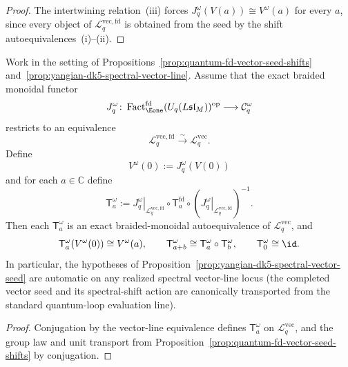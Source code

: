 \begin{proof}
The intertwining relation~\textup{(iii)} forces \(J_q^\omega(V(a))
\cong V^\omega(a)\) for every \(a\), since every object of
\(\mathcal{L}^{\mathrm{vec,fd}}_{q}\) is obtained from the seed by
the shift autoequivalences~\textup{(i)}--\textup{(ii)}.
\end{proof}

\begin{proposition}
\label{prop:yangian-dk5-spectral-seed-shift-construction}
Work in the setting of
Propositions~\ref{prop:quantum-fd-vector-seed-shifts}
and~\ref{prop:yangian-dk5-spectral-vector-line}. Assume that the exact
braided monoidal functor
\[
J_q^\omega\colon
\operatorname{Fact}_{\Eone}^{\mathrm{fd}}(U_q(L\mathfrak{sl}_M))^{\mathrm{op}}
\longrightarrow
\mathcal{C}_q^\omega
\]
restricts to an equivalence
\[
\mathcal{L}^{\mathrm{vec,fd}}_{q}\xrightarrow{\sim}
\mathcal{L}^{\mathrm{vec}}_{q}.
\]
Define
\[
V^\omega(0):=J_q^\omega(V(0))
\]
and for each \(a\in\mathbb{C}\) define
\[
\mathsf{T}^{\omega}_a
:=
\left.J_q^\omega\right|_{\mathcal{L}^{\mathrm{vec,fd}}_{q}}
\circ
\mathsf{T}^{\mathrm{fd}}_a
\circ
\left(\left.J_q^\omega\right|_{\mathcal{L}^{\mathrm{vec,fd}}_{q}}\right)^{-1}.
\]
Then each \(\mathsf{T}^{\omega}_a\) is an exact braided-monoidal
autoequivalence of \(\mathcal{L}^{\mathrm{vec}}_{q}\), and
\[
\mathsf{T}^{\omega}_a(V^\omega(0))\cong V^\omega(a),
\qquad
\mathsf{T}^{\omega}_{a+b}\cong
\mathsf{T}^{\omega}_a\circ \mathsf{T}^{\omega}_b,
\qquad
\mathsf{T}^{\omega}_0\cong \id .
\]
In particular, the hypotheses of
Proposition~\ref{prop:yangian-dk5-spectral-vector-seed} are automatic
on any realized spectral vector-line locus (the completed vector seed
and its spectral-shift action are canonically transported from the
standard quantum-loop evaluation line).
\end{proposition}

\begin{proof}
Conjugation by the vector-line equivalence defines
\(\mathsf{T}^{\omega}_a\) on \(\mathcal{L}^{\mathrm{vec}}_{q}\),
and the group law and unit transport from
Proposition~\ref{prop:quantum-fd-vector-seed-shifts} by conjugation.
\end{proof}

